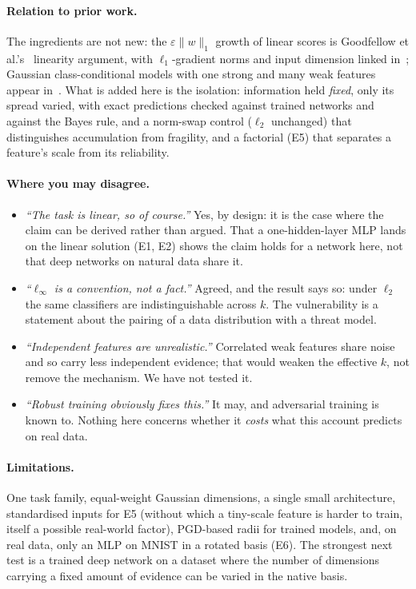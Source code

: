 \documentclass[11pt]{article}
\newcommand{\linf}{\ell_\infty}
\newcommand{\ltwo}{\ell_2}
\begin{document}
\paragraph{Relation to prior work.} The ingredients are not new: the
$\varepsilon\|w\|_1$ growth of linear scores is Goodfellow et
al.'s~\cite{goodfellow2015} linearity argument, with $\ell_1$-gradient norms
and input dimension linked in~\cite{simongabriel2019}; Gaussian
class-conditional models with one strong and many weak features appear
in~\cite{tsipras2018,schmidt2018}. What is added here is the isolation:
information held \emph{fixed}, only its spread varied, with exact predictions
checked against trained networks and against the Bayes rule, and a norm-swap
control ($\ltwo$ unchanged) that distinguishes accumulation from fragility,
and a factorial (E5) that separates a feature's scale from its reliability.

\paragraph{Where you may disagree.}
\begin{itemize}
\item \emph{``The task is linear, so of course.''} Yes, by design: it is the
case where the claim can be derived rather than argued. That a one-hidden-layer
MLP lands on the linear solution (E1, E2) shows the claim holds for a network
here, not that deep networks on natural data share it.
\item \emph{``$\linf$ is a convention, not a fact.''} Agreed, and the result
says so: under $\ltwo$ the same classifiers are indistinguishable across $k$.
The vulnerability is a statement about the pairing of a data distribution with
a threat model.
\item \emph{``Independent features are unrealistic.''} Correlated weak
features share noise and so carry less independent evidence; that would
weaken the effective $k$, not remove the mechanism. We have not tested it.
\item \emph{``Robust training obviously fixes this.''} It may, and adversarial
training is known to. Nothing here concerns whether it \emph{costs} what this
account predicts on real data.
\end{itemize}

\paragraph{Limitations.} One task family, equal-weight Gaussian dimensions,
a single small architecture, standardised inputs for E5 (without which a
tiny-scale feature is harder to train, itself a possible real-world factor),
PGD-based radii for trained models, and, on real data, only an MLP on MNIST in a rotated basis (E6). The strongest next test is
a trained deep network on a dataset where the number of dimensions
carrying a fixed amount of evidence can be varied in the native basis.
\end{document}
